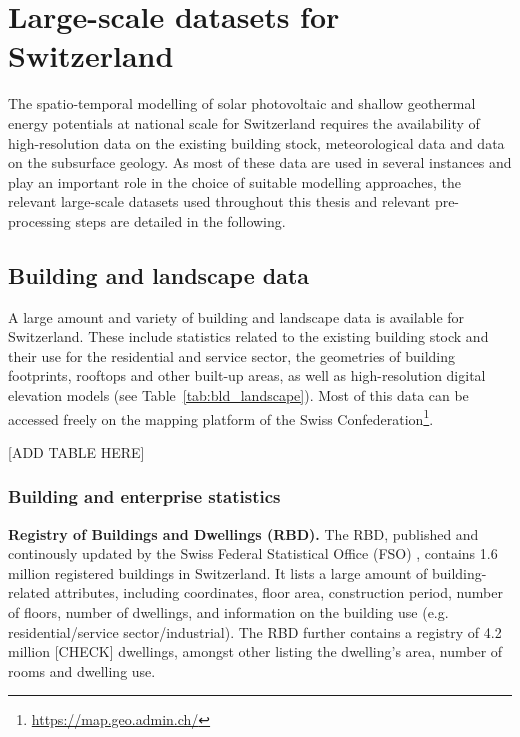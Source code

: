 \chapter{Large-scale datasets for Switzerland}
\label{data}


The spatio-temporal modelling of solar photovoltaic and shallow geothermal energy potentials at national scale for Switzerland requires the availability of high-resolution data on the existing building stock, meteorological data and data on the subsurface geology. 
As most of these data are used in several instances and play an important role in the choice of suitable modelling approaches, the relevant large-scale datasets used throughout this thesis and relevant pre-processing steps are detailed in the following.

\section{Building and landscape data}
A large amount and variety of building and landscape data is available for Switzerland. These include statistics related to the existing building stock and their use for the residential and service sector, the geometries of building footprints, rooftops and other built-up areas, as well as high-resolution digital elevation models (see Table~\ref{tab:bld_landscape}). Most of this data can be accessed freely on the mapping platform of the Swiss Confederation\footnote{\url{https://map.geo.admin.ch/}}.

[ADD TABLE HERE]

\subsection{Building and enterprise statistics}
\label{data_rbd_statent}
\textbf{Registry of Buildings and Dwellings (RBD).} The RBD, published and continously updated by the Swiss Federal Statistical Office (FSO) \cite{bundesamt_fur_statistik_bfs_eidgenossisches_2015}, contains 1.6 million registered buildings in Switzerland.
It lists a large amount of building-related attributes, including coordinates, floor area, construction period, number of floors, number of dwellings, and information on the building use (e.g. residential/service sector/industrial). 
The RBD further contains a registry of 4.2 million [CHECK] dwellings, amongst other listing the dwelling's area, number of rooms and dwelling use.

